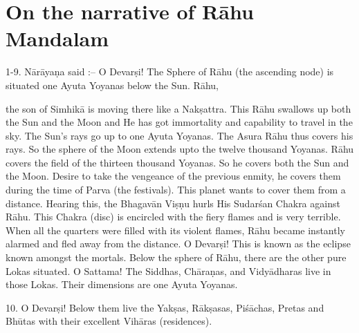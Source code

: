 \chapter{On the narrative of R\=ahu Mandalam}

1-9. N\=ar\=aya\d{n}a said :-- O Devar\d{s}i! The Sphere of R\=ahu (the ascending node) is situated one Ayuta Yoyanas below the Sun. R\=ahu,

the son of Simhik\=a is moving there like a Nak\d{s}attra. This R\=ahu swallows up both the Sun and the Moon and He has got immortality and capability to travel in the sky. The Sun's rays go up to one Ayuta Yoyanas. The Asura R\=ahu thus covers his rays. So the sphere of the Moon extends upto the twelve thousand Yoyanas. R\=ahu covers the field of the thirteen thousand Yoyanas. So he covers both the Sun and the Moon. Desire to take the vengeance of the previous enmity, he covers them during the time of Parva (the festivals). This planet wants to cover them from a distance. Hearing this, the Bhagav\=an Vi\d{s}\d{n}u hurls His Sudar\'san Chakra against R\=ahu. This Chakra (disc) is encircled with the fiery flames and is very terrible. When all the quarters were filled with its violent flames, R\=ahu became instantly alarmed and fled away from the distance. O Devar\d{s}i! This is known as the eclipse known amongst the mortals. Below the sphere of R\=ahu, there are the other pure Lokas situated. O Sattama! The Siddhas, Ch\=ara\d{n}as, and Vidy\=adharas live in those Lokas. Their dimensions are one Ayuta Yoyanas.

10. O Devar\d{s}i! Below them live the Yak\d{s}as, R\=ak\d{s}asas, Pi\'s\=achas, Pretas and Bh\=utas with their excellent Vih\=aras (residences).

